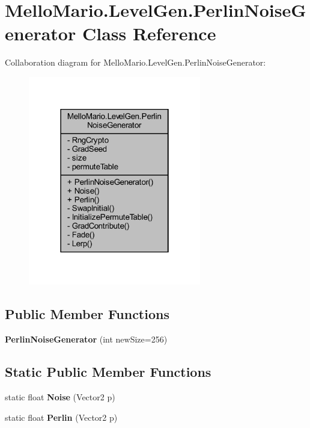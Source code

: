 \section{Mello\+Mario.\+Level\+Gen.\+Perlin\+Noise\+Generator Class Reference}
\label{classMelloMario_1_1LevelGen_1_1PerlinNoiseGenerator}


Collaboration diagram for Mello\+Mario.\+Level\+Gen.\+Perlin\+Noise\+Generator\+:
\nopagebreak
\begin{figure}[H]
\begin{center}
\leavevmode
\includegraphics[width=214pt]{classMelloMario_1_1LevelGen_1_1PerlinNoiseGenerator__coll__graph}
\end{center}
\end{figure}
\subsection*{Public Member Functions}
\begin{DoxyCompactItemize}
\item 
\textbf{ Perlin\+Noise\+Generator} (int new\+Size=256)
\end{DoxyCompactItemize}
\subsection*{Static Public Member Functions}
\begin{DoxyCompactItemize}
\item 
static float \textbf{ Noise} (Vector2 p)
\item 
static float \textbf{ Perlin} (Vector2 p)
\end{DoxyCompactItemize}

